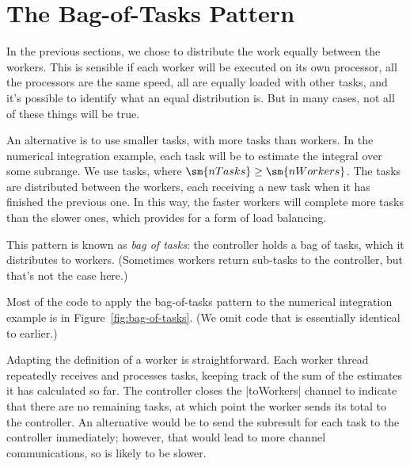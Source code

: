 \section{The Bag-of-Tasks Pattern}

In the previous sections, we chose to distribute the work equally between the
workers.
%
This is sensible if each worker will be executed on its own processor,
all the processors are the same speed, all are equally loaded with other
tasks, and it's possible to identify what an equal distribution is.
%
But in many cases, not all of these things will be true.

An alternative is to use smaller tasks, with more tasks than workers.  
%
In the numerical integration example, each task will be to estimate the
integral over some subrange.   We use  tasks, where
$\sm{nTasks} \ge \sm{nWorkers}$.
%
The tasks are distributed between the workers, each receiving a new task when
it has finished the previous one.  In this way, the faster workers will
complete more tasks than the slower ones, which provides for a form of load
balancing.

This pattern is known as \emph{bag of tasks}: the controller holds a bag of
tasks, which it distributes to workers.  (Sometimes workers return sub-tasks
to the controller, but that's not the case here.)


Most of the code to apply the bag-of-tasks pattern to the numerical
integration example is in Figure~\ref{fig:bag-of-tasks}.  (We omit code that
is essentially identical to earlier.)

Adapting the definition of a worker is straightforward.  Each worker thread
repeatedly receives and processes tasks, keeping track of the sum of the
estimates it has calculated so far.  
%
The controller closes the |toWorkers| channel to indicate that there are no
remaining tasks, at which point the worker sends its total to the controller.
%
An alternative would be to send the subresult for each task to the controller
immediately; however, that would lead to more channel communications, so is
likely to be slower.


